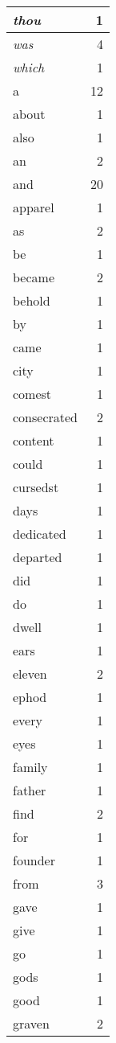 \begin{center}
\begin{longtable}{l|r}
\emph{thou} & 1\\ \hline 
\emph{was} & 4\\ \hline 
\emph{which} & 1\\ \hline 
a & 12\\ \hline 
about & 1\\ \hline 
also & 1\\ \hline 
an & 2\\ \hline 
and & 20\\ \hline 
apparel & 1\\ \hline 
as & 2\\ \hline 
be & 1\\ \hline 
became & 2\\ \hline 
behold & 1\\ \hline 
by & 1\\ \hline 
came & 1\\ \hline 
city & 1\\ \hline 
comest & 1\\ \hline 
consecrated & 2\\ \hline 
content & 1\\ \hline 
could & 1\\ \hline 
cursedst & 1\\ \hline 
days & 1\\ \hline 
dedicated & 1\\ \hline 
departed & 1\\ \hline 
did & 1\\ \hline 
do & 1\\ \hline 
dwell & 1\\ \hline 
ears & 1\\ \hline 
eleven & 2\\ \hline 
ephod & 1\\ \hline 
every & 1\\ \hline 
eyes & 1\\ \hline 
family & 1\\ \hline 
father & 1\\ \hline 
find & 2\\ \hline 
for & 1\\ \hline 
founder & 1\\ \hline 
from & 3\\ \hline 
gave & 1\\ \hline 
give & 1\\ \hline 
go & 1\\ \hline 
gods & 1\\ \hline 
good & 1\\ \hline 
graven & 2\\ \hline 

\end{longtable}
\end{center}
